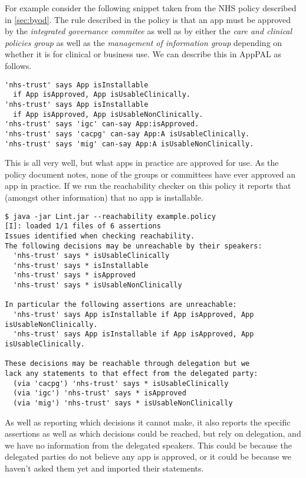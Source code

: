 \documentclass[a4paper]{scrartcl}
\begin{document}
For example consider the following snippet taken from the NHS policy described
in \autoref{sec:byod}.  The rule described in the policy is that an app must be
approved by the \emph{integrated governance commitee} as well as by either the
\emph{care and clinical policies group} as well as the \emph{management of
  information group} depending on whether it is for clinical or business use. We
can describe this in AppPAL as follows.
\begin{lstlisting}
'nhs-trust' says App isInstallable
  if App isApproved, App isUsableClinically.
'nhs-trust' says App isInstallable
  if App isApproved, App isUsableNonClinically.
'nhs-trust' says 'igc' can-say App:isApproved.
'nhs-trust' says 'cacpg' can-say App:A isUsableClinically.
'nhs-trust' says 'mig' can-say App:A isUsableNonClinically.
\end{lstlisting}

This is all very well, but what apps in practice are approved for use.
As the policy document notes, none of the groups or committees have ever
approved an app in practice.  If we run the reachability checker on this policy
it reports that (amongst other information) that no app is installable.

\begin{verbatim}
$ java -jar Lint.jar --reachability example.policy
[I]: loaded 1/1 files of 6 assertions
Issues identified when checking reachability.
The following decisions may be unreachable by their speakers:
  'nhs-trust' says * isUsableClinically
  'nhs-trust' says * isInstallable
  'nhs-trust' says * isApproved
  'nhs-trust' says * isUsableNonClinically

In particular the following assertions are unreachable:
  'nhs-trust' says App isInstallable if App isApproved, App isUsableNonClinically.
  'nhs-trust' says App isInstallable if App isApproved, App isUsableClinically.

These decisions may be reachable through delegation but we
lack any statements to that effect from the delegated party:
  (via 'cacpg') 'nhs-trust' says * isUsableClinically
  (via 'igc') 'nhs-trust' says * isApproved
  (via 'mig') 'nhs-trust' says * isUsableNonClinically
\end{verbatim}

As well as reporting which decisions it cannot make, it also reports the
specific assertions as well as which decisions could be reached, but rely on
delegation, and we have no information from the delegated speakers.  This could
be because the delegated parties do not believe any app is approved, or it could
be because we haven't asked them yet and imported their statements.
\end{document}
